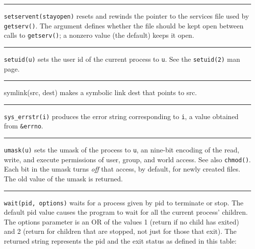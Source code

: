 \bigskip\hrule\vspace{0.1cm}

\noindent
\texttt{setservent(stayopen)} resets and rewinds the pointer to the
services file used by \texttt{getserv()}. The argument defines whether
the file should be kept open between calls to \texttt{getserv()}; a
nonzero value (the default) keeps it open.

\bigskip\hrule\vspace{0.1cm}

\noindent
\texttt{setuid(u)} sets the user id of the current process to
\texttt{u}. See the \texttt{setuid(2)} man page.

\bigskip\hrule\vspace{0.1cm}

\noindent
{}symlink(src, dest) makes a symbolic link dest
that points to src.

\bigskip\hrule\vspace{0.1cm}

\noindent
{}\texttt{sys\_errstr(i)} produces the error string
corresponding to \texttt{i}, a value obtained from \texttt{\&errno}.

\bigskip\hrule\vspace{0.1cm}

\noindent
\texttt{umask(u)} sets the umask of the process to \texttt{u}, an nine-bit
encoding of the read, write, and execute permissions of user,
group, and world access. See also \texttt{chmod()}. Each bit in the umask turns
\textit{off} that access, by default, for newly created files. The old
value of the umask is returned.

\bigskip\hrule\vspace{0.1cm}

\noindent
\texttt{wait(pid, options)} waits for a process given by pid to terminate or
stop. The default pid value causes the program to wait for all the
current process' children. The options parameter is an
OR of the values 1 (return if no child has exited) and 2 (return for
children that are stopped, not just for those that exit). The returned
string represents the pid and the exit status as defined in this table:

